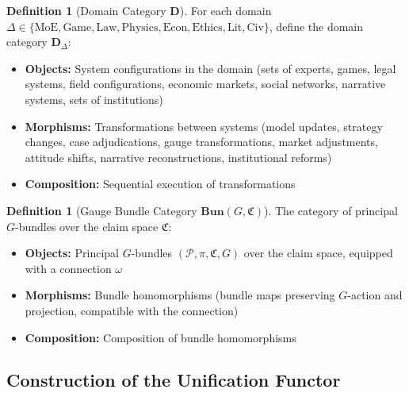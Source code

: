 \documentclass[12pt,a4paper]{article}
\theoremstyle{plain}
\theoremstyle{definition}
\newtheorem{definition}[theorem]{Definition}
\newcommand{\Pcal}{\mathcal{P}}
\newcommand{\conn}{\omega}
\newcommand{\BundleCat}{\mathbf{Bun}}
\newcommand{\ClaimSpace}{\mathfrak{C}}
\begin{document}
\begin{definition}[Domain Category $\mathbf{D}$]
For each domain $\Delta \in \{\text{MoE}, \text{Game}, \text{Law}, \text{Physics}, \text{Econ}, \text{Ethics}, \text{Lit}, \text{Civ}\}$,
define the domain category $\mathbf{D}_\Delta$:
\begin{itemize}
    \item \textbf{Objects:} System configurations in the domain (sets of experts, games, legal systems, field configurations, economic markets, social networks, narrative systems, sets of institutions)
    \item \textbf{Morphisms:} Transformations between systems (model updates, strategy changes, case adjudications, gauge transformations, market adjustments, attitude shifts, narrative reconstructions, institutional reforms)
    \item \textbf{Composition:} Sequential execution of transformations
\end{itemize}
\end{definition}

\begin{definition}[Gauge Bundle Category $\BundleCat(G, \ClaimSpace)$]
The category of principal $G$-bundles over the claim space $\ClaimSpace$:
\begin{itemize}
    \item \textbf{Objects:} Principal $G$-bundles $(\Pcal, \pi, \ClaimSpace, G)$ over the claim space, equipped with a connection $\conn$
    \item \textbf{Morphisms:} Bundle homomorphisms (bundle maps preserving $G$-action and projection, compatible with the connection)
    \item \textbf{Composition:} Composition of bundle homomorphisms
\end{itemize}
\end{definition}

\subsection{Construction of the Unification Functor}
\end{document}
